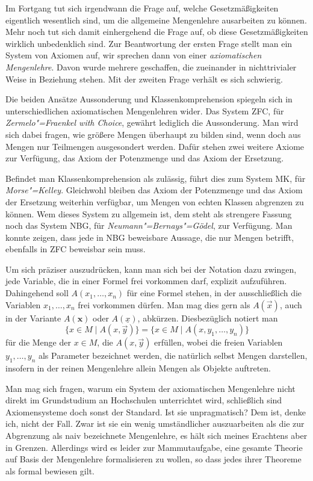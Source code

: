 Im Fortgang tut sich irgendwann die Frage auf, welche Gesetzmäßigkeiten
eigentlich wesentlich sind, um die allgemeine Mengenlehre ausarbeiten
zu können. Mehr noch tut sich damit einhergehend die Frage auf, ob diese
Gesetzmäßigkeiten wirklich unbedenklich sind. Zur Beantwortung der
ersten Frage stellt man ein System von Axiomen auf, wir sprechen dann
von einer \emph{axiomatischen Mengenlehre}. Davon wurde mehrere
geschaffen, die zueinander in nichttrivialer Weise in Beziehung stehen.
Mit der zweiten Frage verhält es sich schwierig.

Die beiden Ansätze Aussonderung und Klassenkomprehension spiegeln
sich in unterschiedlichen axiomatischen Mengenlehren wider. Das
System ZFC, für \emph{Zermelo"=Fraenkel with Choice}, gewährt lediglich
die Aussonderung. Man wird sich dabei fragen, wie größere Mengen
überhaupt zu bilden sind, wenn doch aus Mengen nur Teilmengen ausgesondert
werden. Dafür stehen zwei weitere Axiome zur Verfügung, das Axiom der
Potenzmenge und das Axiom der Ersetzung.

Befindet man Klassenkomprehension als zulässig, führt dies zum
System MK, für \emph{Morse"=Kelley}. Gleichwohl bleiben das Axiom der
Potenzmenge und das Axiom der Ersetzung weiterhin verfügbar, um Mengen
von echten Klassen abgrenzen zu können. Wem dieses System zu allgemein
ist,  dem steht als strengere Fassung noch das System NBG, für
\emph{Neumann"=Bernays"=Gödel}, zur Verfügung. Man konnte zeigen,
dass jede in NBG beweisbare Aussage, die nur Mengen betrifft,
ebenfalls in ZFC beweisbar sein muss.

Um sich präziser auszudrücken, kann man sich bei der Notation dazu
zwingen, jede Variable, die in einer Formel frei vorkommen darf,
explizit aufzuführen. Dahingehend soll $A(x_1,\ldots,x_n)$ für eine
Formel stehen, in der ausschließlich die Variablen $x_1,\ldots,x_n$
frei vorkommen dürfen. Man mag dies gern als $A(\vec x)$, auch
in der Variante $A(\mathbf x)$ oder $A(\underline x)$, abkürzen. Diesbezüglich
notiert man
\[\{x\in M\mid A(x,\vec y)\} = \{x\in M\mid A(x,y_1,\ldots,y_n)\}\]
für die Menge der $x\in M$, die $A(x,\vec y)$ erfüllen, wobei die freien
Variablen $y_1,\ldots, y_n$ als Parameter bezeichnet werden, die natürlich
selbst Mengen darstellen, insofern in der reinen Mengenlehre allein Mengen als
Objekte auftreten.

Man mag sich fragen, warum ein System der axiomatischen Mengenlehre nicht
direkt im Grundstudium an Hochschulen unterrichtet wird, schließlich sind
Axiomensysteme doch sonst der Standard. Ist sie unpragmatisch? Dem ist,
denke ich, nicht der Fall. Zwar ist sie ein wenig umständlicher
auszuarbeiten als die zur Abgrenzung als naiv bezeichnete Mengenlehre,
es hält sich meines Erachtens aber in Grenzen. Allerdings wird es leider
zur Mammutaufgabe, eine gesamte Theorie auf Basis der Mengenlehre
formalisieren zu wollen, so dass jedes ihrer Theoreme als formal
bewiesen gilt.

